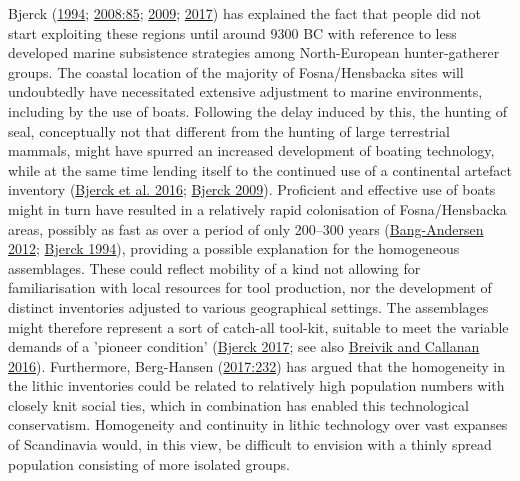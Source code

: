 \documentclass[
  12pt,
  a4paper,
  oneside]{book}
\begin{document}
Bjerck (\protect\hyperlink{ref-bjerck1994}{1994}; \protect\hyperlink{ref-bjerck2008}{2008:85}; \protect\hyperlink{ref-bjerck2009}{2009}; \protect\hyperlink{ref-bjerck2017}{2017}) has explained the fact that people did not start exploiting these regions until around 9300 BC with reference to less developed marine subsistence strategies among North-European hunter-gatherer groups. The coastal location of the majority of Fosna/Hensbacka sites will undoubtedly have necessitated extensive adjustment to marine environments, including by the use of boats. Following the delay induced by this, the hunting of seal, conceptually not that different from the hunting of large terrestrial mammals, might have spurred an increased development of boating technology, while at the same time lending itself to the continued use of a continental artefact inventory (\protect\hyperlink{ref-bjerck2016}{Bjerck et al. 2016}; \protect\hyperlink{ref-bjerck2009}{Bjerck 2009}). Proficient and effective use of boats might in turn have resulted in a relatively rapid colonisation of Fosna/Hensbacka areas, possibly as fast as over a period of only 200--300 years (\protect\hyperlink{ref-bang-andersen2012}{Bang-Andersen 2012}; \protect\hyperlink{ref-bjerck1994}{Bjerck 1994}), providing a possible explanation for the homogeneous assemblages. These could reflect mobility of a kind not allowing for familiarisation with local resources for tool production, nor the development of distinct inventories adjusted to various geographical settings. The assemblages might therefore represent a sort of catch-all tool-kit, suitable to meet the variable demands of a 'pioneer condition' (\protect\hyperlink{ref-bjerck2017}{Bjerck 2017}; see also \protect\hyperlink{ref-breivik2016}{Breivik and Callanan 2016}). Furthermore, Berg-Hansen (\protect\hyperlink{ref-berg-hansen2017}{2017:232}) has argued that the homogeneity in the lithic inventories could be related to relatively high population numbers with closely knit social ties, which in combination has enabled this technological conservatism. Homogeneity and continuity in lithic technology over vast expanses of Scandinavia would, in this view, be difficult to envision with a thinly spread population consisting of more isolated groups.
\end{document}
